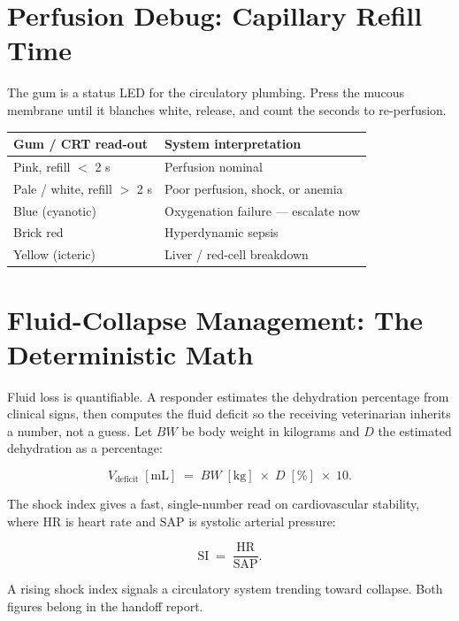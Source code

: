 \documentclass[12pt,oneside]{book}
\begin{document}
\section{Perfusion Debug: Capillary Refill Time}
The gum is a status LED for the circulatory plumbing. Press the mucous
membrane until it blanches white, release, and count the seconds to
re-perfusion.

\begin{center}
\renewcommand{\arraystretch}{1.35}
\begin{tabular}{l l}
\toprule
\textbf{Gum / CRT read-out} & \textbf{System interpretation} \\
\midrule
Pink, refill $<$ 2 s        & Perfusion nominal \\
Pale / white, refill $>$ 2 s & Poor perfusion, shock, or anemia \\
Blue (cyanotic)             & Oxygenation failure --- escalate now \\
Brick red                   & Hyperdynamic sepsis \\
Yellow (icteric)            & Liver / red-cell breakdown \\
\bottomrule
\end{tabular}
\end{center}

\section{Fluid-Collapse Management: The Deterministic Math}
Fluid loss is quantifiable. A responder estimates the dehydration
percentage from clinical signs, then computes the fluid deficit so the
receiving veterinarian inherits a number, not a guess. Let $BW$ be body
weight in kilograms and $D$ the estimated dehydration as a percentage:

\begin{equation}
  V_{\text{deficit}}\;[\text{mL}] \;=\; BW\;[\text{kg}] \;\times\; D\;[\%] \;\times\; 10 .
\end{equation}

\noindent The shock index gives a fast, single-number read on
cardiovascular stability, where $\mathrm{HR}$ is heart rate and
$\mathrm{SAP}$ is systolic arterial pressure:

\begin{equation}
  \mathrm{SI} \;=\; \frac{\mathrm{HR}}{\mathrm{SAP}} .
\end{equation}

\noindent A rising shock index signals a circulatory system trending
toward collapse. Both figures belong in the handoff report.
\end{document}
